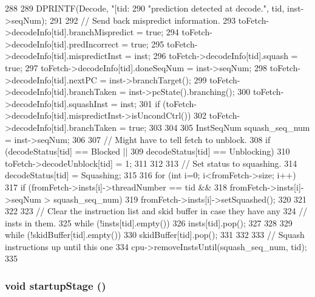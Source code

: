 \begin{DoxyCode}
288 {
289     DPRINTF(Decode, "[tid:%
290             "prediction detected at decode.\n", tid, inst->seqNum);
291 
292     // Send back mispredict information.
293     toFetch->decodeInfo[tid].branchMispredict = true;
294     toFetch->decodeInfo[tid].predIncorrect = true;
295     toFetch->decodeInfo[tid].mispredictInst = inst;
296     toFetch->decodeInfo[tid].squash = true;
297     toFetch->decodeInfo[tid].doneSeqNum = inst->seqNum;
298     toFetch->decodeInfo[tid].nextPC = inst->branchTarget();
299     toFetch->decodeInfo[tid].branchTaken = inst->pcState().branching();
300     toFetch->decodeInfo[tid].squashInst = inst;
301     if (toFetch->decodeInfo[tid].mispredictInst->isUncondCtrl()) {
302             toFetch->decodeInfo[tid].branchTaken = true;
303     }
304 
305     InstSeqNum squash_seq_num = inst->seqNum;
306 
307     // Might have to tell fetch to unblock.
308     if (decodeStatus[tid] == Blocked ||
309         decodeStatus[tid] == Unblocking) {
310         toFetch->decodeUnblock[tid] = 1;
311     }
312 
313     // Set status to squashing.
314     decodeStatus[tid] = Squashing;
315 
316     for (int i=0; i<fromFetch->size; i++) {
317         if (fromFetch->insts[i]->threadNumber == tid &&
318             fromFetch->insts[i]->seqNum > squash_seq_num) {
319             fromFetch->insts[i]->setSquashed();
320         }
321     }
322 
323     // Clear the instruction list and skid buffer in case they have any
324     // insts in them.
325     while (!insts[tid].empty()) {
326         insts[tid].pop();
327     }
328 
329     while (!skidBuffer[tid].empty()) {
330         skidBuffer[tid].pop();
331     }
332 
333     // Squash instructions up until this one
334     cpu->removeInstsUntil(squash_seq_num, tid);
335 }
\end{DoxyCode}
\hypertarget{classDefaultDecode_a31d4cbdab16d4ff8d6bc7f84ece727da}{
\subsubsection[{startupStage}]{\setlength{\rightskip}{0pt plus 5cm}void startupStage ()}}
\label{classDefaultDecode_a31d4cbdab16d4ff8d6bc7f84ece727da}



